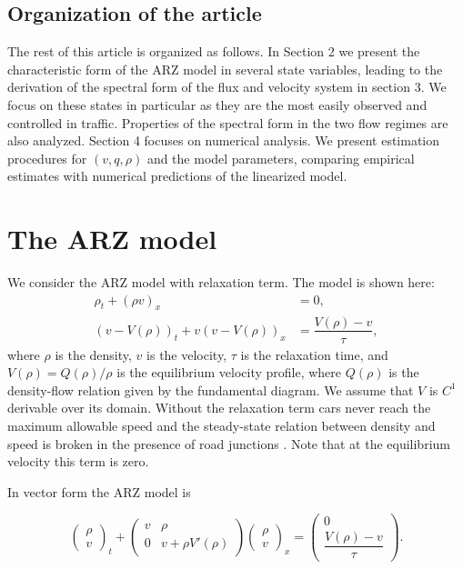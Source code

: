 \documentclass[5p,twocolumn]{elsarticle}
\begin{document}
\subsection{Organization of the article}
The rest of this article is organized as follows. In Section 2 we present the characteristic form of the ARZ model in several state variables, leading to the derivation of the spectral form of the flux and velocity system in section 3. We focus on these states in particular as they are the most easily observed and controlled in traffic. Properties of the spectral form in the two flow regimes are also analyzed. Section 4 focuses on numerical analysis. We present estimation procedures for $(v,q,\rho)$ and the model parameters, comparing empirical estimates with numerical predictions of the linearized model.


\section{The ARZ model} \label{ARZSection}


We consider the ARZ model with relaxation term. The model is shown here: 
\begin{align} 
\rho_t + (\rho v)_x &= 0, \label{ARZ1} \\
(v - V(\rho))_t + v(v - V(\rho))_x &=\dfrac{V(\rho) - v}{\tau} \label{ARZ2},
\end{align}
where $\rho$ is the density, $v$ is the velocity, $\tau$ is the relaxation time, and $V(\rho) = Q(\rho)/\rho$ is the equilibrium velocity profile, where $Q(\rho)$ is the density-flow relation given by the fundamental diagram. We assume that $V$ is $C^{1}$ derivable over its domain. Without the relaxation term cars never reach the maximum allowable speed \cite{R_improved} and the steady-state relation between density and speed is broken in the presence of road junctions \cite{jin2015}. Note that at the equilibrium velocity this term is zero. 

In vector form the ARZ model is

{\footnotesize
\begin{equation} \label{ARZrhov}
\begin{pmatrix}
\rho \\ v
\end{pmatrix}_t
+ \begin{pmatrix}
v & \rho \\
0 & v + \rho V' (\rho)
\end{pmatrix}
\begin{pmatrix}
\rho \\ v
\end{pmatrix}_x = 
\begin{pmatrix}
0 \\ \dfrac{V(\rho) - v}{\tau}
\end{pmatrix}.
\end{equation}
}
\end{document}
